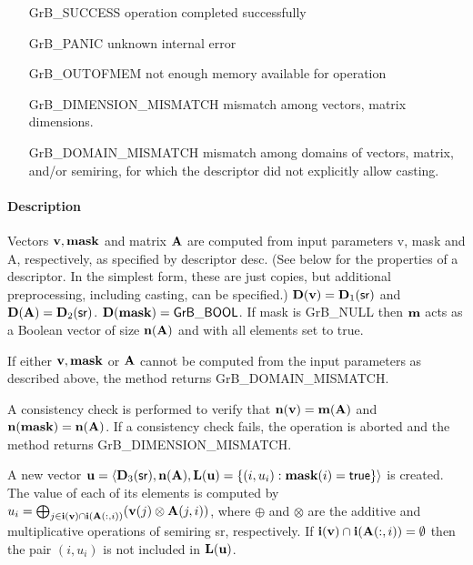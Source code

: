 
\begin{itemize}[leftmargin=2.1in]
\item[{\sf GrB\_SUCCESS}]             operation completed successfully
\item[{\sf GrB\_PANIC}]               unknown internal error
\item[{\sf GrB\_OUTOFMEM}]            not enough memory available for operation
\item[{\sf GrB\_DIMENSION\_MISMATCH}] mismatch among vectors, matrix dimensions.
\item[{\sf GrB\_DOMAIN\_MISMATCH}]    mismatch among domains of vectors, matrix, and/or semiring, for which the descriptor did not explicitly allow casting.
\end{itemize}

\paragraph{Description}

Vectors ${\bf v}, {\bf mask}$ and matrix ${\bf A}$ are computed from
input parameters {\sf v}, {\sf mask} and {\sf A}, respectively, as specified
by descriptor {\sf desc}. (See below for the properties of a descriptor. In
the simplest form, these are just copies, but additional preprocessing,
including casting, can be specified.)  $\bold{D}({\bf v}) =
\bold{D}_1({\sf sr})$ and $\bold{D}({\bf A}) = \bold{D}_2({\sf sr})$.
$\bold{D}({\bf mask}) = {\sf GrB\_BOOL}$.  If {\sf mask} is {\sf GrB\_NULL}
then ${\bf m}$ acts as a Boolean vector of size $\bold{n}({\bf A})$
and with all elements set to {\sf true}.

If either ${\bf v}, {\bf mask}$ or ${\bf A}$ cannot be computed
from the input parameters as described above, the method returns {\sf
GrB\_DOMAIN\_MISMATCH}.

A consistency check is performed to verify that $\bold{n}({\bf v})
= \bold{m}({\bf A})$ and $\bold{n}({\bf mask}) =
\bold{n}({\bf A})$. If a consistency check fails, the operation is
aborted and the method returns {\sf GrB\_DIMENSION\_MISMATCH}.

A new vector ${\bf u} = \langle \bold{D}_3({\sf sr}),
\bold{n}({\bf A}), \bold{L}({\bf u}) = \{(i,u_i) : {\bf mask}(i)
= {\sf true} \} \rangle$ is created.  The value of each of its elements
is computed by $u_i = \bigoplus_{j \in {\bf i}({\bf v}) \cap
{\bf i}({\bf A}(:,i))} ({\bf v}(j) \otimes {\bf A}(j,i))$,
where $\oplus$ and $\otimes$ are the additive and multiplicative
operations of semiring {\sf sr}, respectively.  If ${\bf i}({\bf v})
\cap {\bf i}({\bf A}(:,i)) = \emptyset$ then the pair $(i,u_i)$
is not included in $\bold{L}({\bf u})$.

